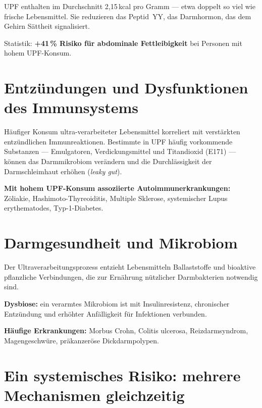 \documentclass[a5paper,12pt,oneside,openany]{book}
\begin{document}
UPF enthalten im Durchschnitt 2,15\,kcal pro Gramm --- etwa doppelt so viel
wie frische Lebensmittel. Sie reduzieren das Peptid~YY, das Darmhormon, das
dem Gehirn S\"{a}ttheit signalisiert.

Statistik: \textbf{+41\,\% Risiko f\"{u}r abdominale Fettleibigkeit} bei
Personen mit hohem UPF-Konsum.

\section{Entz\"{u}ndungen und Dysfunktionen des Immunsystems}

H\"{a}ufiger Konsum ultra-verarbeiteter Lebensmittel korreliert mit
verst\"{a}rkten entz\"{u}ndlichen Immunreaktionen. Bestimmte in UPF h\"{a}ufig
vorkommende Substanzen --- Emulgatoren, Verdickungsmittel und Titandioxid
(E171) --- k\"{o}nnen das Darmmikrobiom ver\"{a}ndern und die
Durchl\"{a}ssigkeit der Darmschleimhaut erh\"{o}hen (\textit{leaky gut}).

\textbf{Mit hohem UPF-Konsum assoziierte Autoimmunerkrankungen:}
Z\"{o}liakie, Hashimoto-Thyreoiditis, Multiple Sklerose, systemischer Lupus
erythematodes, Typ-1-Diabetes.

\section{Darmgesundheit und Mikrobiom}

Der Ultraverarbeitungsprozess entzieht Lebensmitteln Ballaststoffe und
bioaktive pflanzliche Verbindungen, die zur Ern\"{a}hrung n\"{u}tzlicher
Darmbakterien notwendig sind.

\textbf{Dysbiose:} ein verarmtes Mikrobiom ist mit Insulinresistenz, chronischer
Entz\"{u}ndung und erh\"{o}hter Anf\"{a}lligkeit f\"{u}r Infektionen verbunden.

\textbf{H\"{a}ufige Erkrankungen:} Morbus Crohn, Colitis ulcerosa,
Reizdarmsyndrom, Magengeschw\"{u}re, pr\"{a}kanzer\"{o}se
Dickdarmpolypen.

\section{Ein systemisches Risiko: mehrere Mechanismen gleichzeitig}
\end{document}
